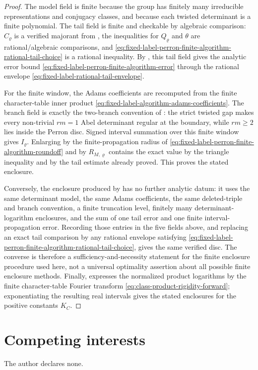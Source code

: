\documentclass[11pt,a4paper]{amsart}
\theoremstyle{plain}
\theoremstyle{definition}
\theoremstyle{remark}
\begin{document}
\begin{proof}
  The model field is finite because the group has finitely many irreducible
  representations and conjugacy classes, and because each twisted determinant
  is a finite polynomial.  The tail field is finite and checkable by algebraic
  comparison: \(C_\varrho\) is a verified majorant from
  , the inequalities for
  \(Q_\varrho\) and \(\theta\) are rational/algebraic comparisons, and
  \eqref{eq:fixed-label-perron-finite-algorithm-rational-tail-choice} is a
  rational inequality.  By ,
  this tail field gives the analytic error bound
  \eqref{eq:fixed-label-perron-finite-algorithm-error} through the rational
  envelope \eqref{eq:fixed-label-rational-tail-envelope}.

  For the finite window, the Adams coefficients are recomputed from the finite
  character-table inner product
  \eqref{eq:fixed-label-algorithm-adams-coefficients}.  The branch field is
  exactly the two-branch convention of
  : the strict twisted gap makes
  every non-trivial \(rm=1\) Abel determinant regular at the boundary, while
  \(rm\ge2\) lies inside the Perron disc.  Signed interval summation over this
  finite window gives \(I_\varrho\).  Enlarging by the finite-propagation radius
  of \eqref{eq:fixed-label-perron-finite-algorithm-roundoff} and by
  \(R_{M,\varrho}\) contains the exact value by the triangle inequality and by
  the tail estimate already proved.  This proves the stated enclosure.

  Conversely, the enclosure produced by 
  has no further analytic datum: it uses the same determinant model, the same
  Adams coefficients, the same deleted-triple and branch convention, a finite
  truncation level, finitely many determinant-logarithm enclosures, and the sum
  of one tail error and one finite interval-propagation error.  Recording those
  entries in the five fields above, and replacing an exact tail comparison by
  any rational envelope satisfying
  \eqref{eq:fixed-label-perron-finite-algorithm-rational-tail-choice}, gives
  the same verified disc.  The converse is therefore a sufficiency-and-necessity
  statement for the finite enclosure procedure used here, not a universal
  optimality assertion about all possible finite enclosure methods.  Finally,
   expresses the normalized product
  logarithms by the finite character-table Fourier transform
  \eqref{eq:class-product-rigidity-forward}; exponentiating the resulting real
  intervals gives the stated enclosures for the positive constants \(K_C\).
\end{proof}






\section*{Competing interests}
The author declares none.



\end{document}
